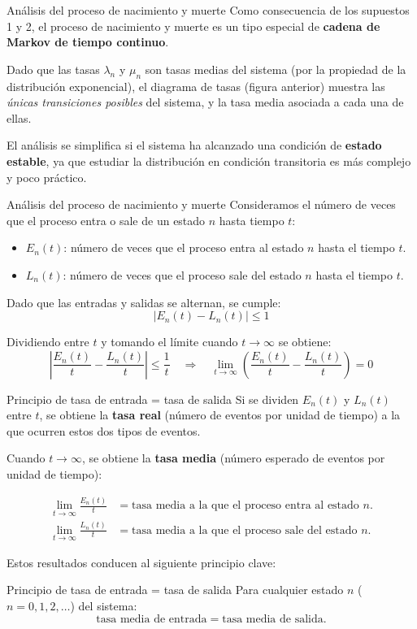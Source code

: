 \documentclass{beamer}
\begin{document}
\begin{frame}{Análisis del proceso de nacimiento y muerte}
\justifying
Como consecuencia de los supuestos 1 y 2, el proceso de nacimiento y muerte es un tipo especial de \textbf{cadena de Markov de tiempo continuo}. 

Dado que las tasas $\lambda_n$ y $\mu_n$ son tasas medias del sistema (por la propiedad de la distribución exponencial), el diagrama de tasas (figura anterior) muestra las \textit{únicas transiciones posibles} del sistema, y la tasa media asociada a cada una de ellas.

\medskip
El análisis se simplifica si el sistema ha alcanzado una condición de \textbf{estado estable}, ya que estudiar la distribución en condición transitoria es más complejo y poco práctico.

\end{frame}

\begin{frame}{Análisis del proceso de nacimiento y muerte}
Consideramos el número de veces que el proceso entra o sale de un estado $n$ hasta tiempo $t$:
\begin{itemize}
    \item $E_n(t)$: número de veces que el proceso entra al estado $n$ hasta el tiempo $t$.
    \item $L_n(t)$: número de veces que el proceso sale del estado $n$ hasta el tiempo $t$.
\end{itemize}

Dado que las entradas y salidas se alternan, se cumple:
\[
\left| E_n(t) - L_n(t) \right| \leq 1
\]

Dividiendo entre $t$ y tomando el límite cuando $t \to \infty$ se obtiene:
\[
\left| \frac{E_n(t)}{t} - \frac{L_n(t)}{t} \right| \leq \frac{1}{t} \quad \Rightarrow \quad \lim_{t \to \infty} \left( \frac{E_n(t)}{t} - \frac{L_n(t)}{t} \right) = 0
\]
\end{frame}

\begin{frame}{Principio de tasa de entrada = tasa de salida}
\justifying
Si se dividen $E_n(t)$ y $L_n(t)$ entre $t$, se obtiene la \textbf{tasa real} (número de eventos por unidad de tiempo) a la que ocurren estos dos tipos de eventos. 

Cuando $t \to \infty$, se obtiene la \textbf{tasa media} (número esperado de eventos por unidad de tiempo):

\begin{align*}
\lim_{t \to \infty} \frac{E_n(t)}{t} &= \text{tasa media a la que el proceso entra al estado } n. \\
\lim_{t \to \infty} \frac{L_n(t)}{t} &= \text{tasa media a la que el proceso sale del estado } n.
\end{align*}

\medskip
Estos resultados conducen al siguiente principio clave:

\begin{block}{\centering Principio de tasa de entrada = tasa de salida}
Para cualquier estado $n$ ($n = 0, 1, 2, \dots$) del sistema: 
\[
\text{tasa media de entrada} = \text{tasa media de salida}.
\]
\end{block}
\end{frame}
\end{document}
